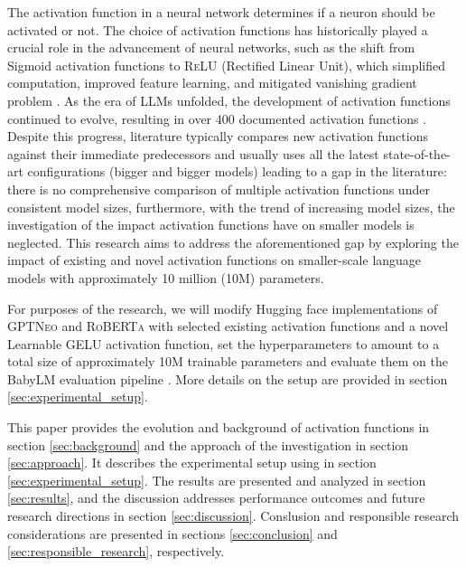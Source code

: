 The activation function in a neural network determines if a neuron should be activated or not. The choice of activation functions has historically played a crucial role in the advancement of neural networks, such as the shift from Sigmoid activation functions to \textsc{ReLU} (Rectified Linear Unit), which simplified computation, improved feature learning, and mitigated vanishing gradient problem \cite{nair2010rectified}. As the era of LLMs unfolded, the development of activation functions continued to evolve, resulting in over 400 documented activation functions \cite{Kunc2024}. Despite this progress, literature typically compares new activation functions against their immediate predecessors and usually uses all the latest state-of-the-art configurations (bigger and bigger models) leading to a gap in the literature: there is no comprehensive comparison of multiple activation functions under consistent model sizes, furthermore, with the trend of increasing model sizes, the investigation of the impact activation functions have on smaller models is neglected. This research aims to address the aforementioned gap by exploring the impact of existing and novel activation functions on smaller-scale language models with approximately 10 million (10M) parameters. 

For purposes of the research, we will modify Hugging face implementations of \textsc{GPTNeo} \cite{huggingfaceNEO} and \textsc{RoBERTa} \cite{huggingfaceRoberta} with selected existing activation functions and a novel Learnable GELU activation function, set the hyperparameters to amount to a total size of approximately 10M trainable parameters and evaluate them on the BabyLM evaluation pipeline \cite{Warstadt2023}. More details on the setup are provided in section \ref{sec:experimental_setup}.

This paper provides the evolution and background of activation functions in section \ref{sec:background} and the approach of the investigation in section \ref{sec:approach}. It describes the experimental setup using in section \ref{sec:experimental_setup}. The results are presented and analyzed in section \ref{sec:results}, and the discussion addresses performance outcomes and future research directions in section \ref{sec:discussion}. Conslusion and responsible research considerations are presented in sections \ref{sec:conclusion} and \ref{sec:responsible_research}, respectively.